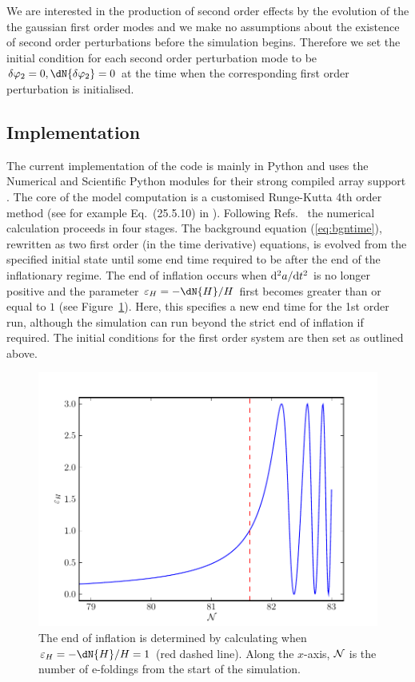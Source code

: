 We are interested in the production of second order effects by the
evolution of the the gaussian first order modes and we make no
assumptions about the existence of second order perturbations before
the simulation begins. Therefore we set the initial condition for each second order
perturbation mode to be $\dvp2=0, \dN{\dvp2}=0$ at
the time when the corresponding first order perturbation is initialised.



\subsection{Implementation} 
\label{sec:implementation}


The current implementation of the code is mainly in Python and uses the
Numerical and Scientific Python modules for their strong compiled array support
\cite{scipy}. The core of the model computation is a customised
Runge-Kutta 4th order method (see for example Eq.~(25.5.10) in
\cite{abramowitz+stegun}).  Following
Refs.~\cite{Martin:2006rs,Ringeval:2007am} the numerical calculation
proceeds in four stages. The background equation (\ref{eq:bgntime}),
rewritten as two first order (in the time derivative) equations, is
evolved from the specified initial state until some end time required
to be after the end of the inflationary regime.  The end of inflation
occurs when $\mathrm{d}^2a/\mathrm{d} t^2$ is no longer positive and the parameter
$\varepsilon_H = -\dN{H}/H$ first becomes greater than or equal to $1$
(see Figure~\ref{fig:eps}). Here, this specifies a new end time for the 1st
order run, although the simulation can run beyond the strict end of
inflation if required. The initial conditions for the first order
system are then set as outlined above.
%
\begin{figure}
\centering
 \includegraphics[scale=0.8]{./numerical/graphs/bgepsilon}
 \caption{The end of inflation is determined by calculating when
   $\varepsilon_H=-\dN{H}/H=1$ (red dashed line). Along the $x$-axis,
   $\mathcal{N}$ is the number of e-foldings from the start of the
   simulation.}
\label{fig:eps}
\end{figure}

